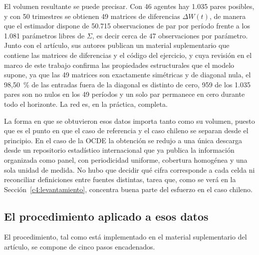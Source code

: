 El volumen resultante se puede precisar. Con 46 agentes hay 1.035 pares posibles, y con 50 trimestres se obtienen 49 matrices de diferencias $\Delta W(t)$, de manera que el estimador dispone de 50.715 observaciones de par por período frente a los 1.081 parámetros libres de $\Sigma$, es decir cerca de 47 observaciones por parámetro. Junto con el artículo, sus autores publican un material suplementario que contiene las matrices de diferencias y el código del ejercicio, y cuya revisión en el marco de este trabajo confirma las propiedades estructurales que el modelo supone, ya que las 49 matrices son exactamente simétricas y de diagonal nula, el 98,50~\% de las entradas fuera de la diagonal es distinto de cero, 959 de los 1.035 pares son no nulos en los 49 períodos y un solo par permanece en cero durante todo el horizonte. La red es, en la práctica, completa.

La forma en que se obtuvieron esos datos importa tanto como su volumen, puesto que es el punto en que el caso de referencia y el caso chileno se separan desde el principio. En el caso de la OCDE la obtención se redujo a una única descarga desde un repositorio estadístico internacional que ya publica la información organizada como panel, con periodicidad uniforme, cobertura homogénea y una sola unidad de medida. No hubo que decidir qué cifra corresponde a cada celda ni reconciliar definiciones entre fuentes distintas, tarea que, como se verá en la Sección~\ref{c4:levantamiento}, concentra buena parte del esfuerzo en el caso chileno.

\subsection{El procedimiento aplicado a esos datos}
\label{c4:ocde-procedimiento}

El procedimiento, tal como está implementado en el material suplementario del artículo, se compone de cinco pasos encadenados.

